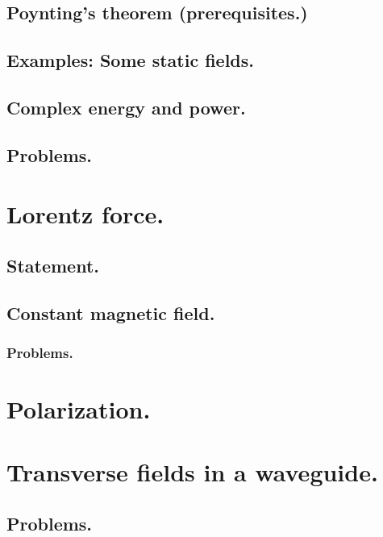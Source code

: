          \subsection{Poynting's theorem (prerequisites.)}
            
         \subsection{Examples: Some static fields.}
            
         \subsection{Complex energy and power.}
            
         \subsection{Problems.}
            
      \section{Lorentz force.}
         \subsection{Statement.}
            
         \subsection{Constant magnetic field.}
            
            \subsubsection{Problems.}
               
      \section{Polarization.}
         
      \section{Transverse fields in a waveguide.}
         
         \subsection{Problems.}
            
